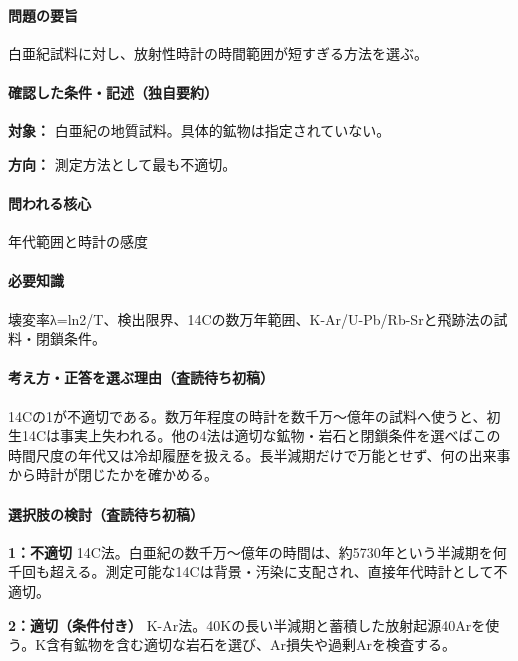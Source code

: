 \paragraph{問題の要旨} 白亜紀試料に対し、放射性時計の時間範囲が短すぎる方法を選ぶ。

\paragraph{確認した条件・記述（独自要約）}\mbox{}\par

\noindent\textbf{対象：} 白亜紀の地質試料。具体的鉱物は指定されていない。\par

\noindent\textbf{方向：} 測定方法として最も不適切。\par

\paragraph{問われる核心} 年代範囲と時計の感度

\paragraph{必要知識} 壊変率λ=ln2/T、検出限界、14Cの数万年範囲、K-Ar/U-Pb/Rb-Srと飛跡法の試料・閉鎖条件。

\paragraph{考え方・正答を選ぶ理由（査読待ち初稿）} 14Cの1が不適切である。数万年程度の時計を数千万〜億年の試料へ使うと、初生14Cは事実上失われる。他の4法は適切な鉱物・岩石と閉鎖条件を選べばこの時間尺度の年代又は冷却履歴を扱える。長半減期だけで万能とせず、何の出来事から時計が閉じたかを確かめる。

\paragraph{選択肢の検討（査読待ち初稿）}\mbox{}\par

\noindent\textbf{1：不適切} 14C法。白亜紀の数千万〜億年の時間は、約5730年という半減期を何千回も超える。測定可能な14Cは背景・汚染に支配され、直接年代時計として不適切。\par

\noindent\textbf{2：適切（条件付き）} K-Ar法。40Kの長い半減期と蓄積した放射起源40Arを使う。K含有鉱物を含む適切な岩石を選び、Ar損失や過剰Arを検査する。\par

